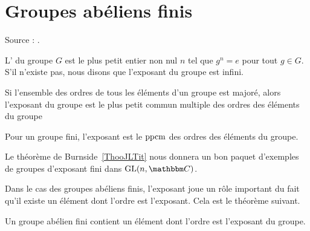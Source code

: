 
\section{Groupes abéliens finis}

Source : \cite{FabricegPSFinis}.

\begin{definition}  \label{DefvtSAyb}
    L' du groupe \( G\) est le plus petit entier non nul \( n\) tel que \( g^n=e\) pour tout \( g\in G\). S'il n'existe pas, nous disons que l'exposant du groupe est infini.
\end{definition}

\begin{proposition}\label{PROPooSWHHooOzqWkw}
    Si l'ensemble des ordres de tous les éléments d'un groupe est majoré, alors l'exposant du groupe est le plus petit commun multiple des ordres des éléments du groupe

    Pour un groupe fini, l'exposant est le $\operatorname{ppcm}$ des ordres des éléments du groupe.
\end{proposition}

Le théorème de Burnside~\ref{ThooJLTit} nous donnera un bon paquet d'exemples de groupes d'exposant fini dans \( \GL(n,\eC)\).


Dans le cas des groupes abéliens finis, l'exposant joue un rôle important du fait qu'il existe un élément dont l'ordre est l'exposant. Cela est le théorème suivant.

\begin{theorem}
    Un groupe abélien fini contient un élément dont l'ordre est l'exposant du groupe.
\end{theorem}

